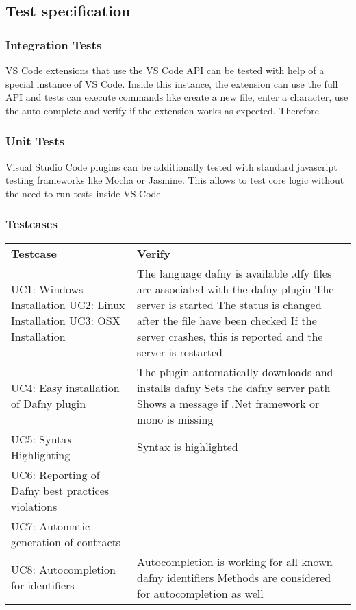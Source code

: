 \subsection{Test specification}

\subsubsection{Integration Tests}
VS Code extensions that use the VS Code API can be tested with help of a special instance of VS Code. Inside this instance, the extension can use the full API and tests can execute commands like create a new file, enter a character, use the auto-complete and verify if the extension works as expected. Therefore  


\subsubsection{Unit Tests}
	Visual Studio Code plugins can be additionally tested with standard javascript testing frameworks like Mocha or Jasmine. This allows to test core logic without the need to run tests inside VS Code. 

\subsubsection{Testcases}

\begin{longtable}{ p{} | p{} }
	\textbf{Testcase} & \textbf{Verify}\\
	UC1: Windows Installation\newline 
	UC2: Linux Installation\newline 
	UC3: OSX Installation & 
		The language dafny is available\newline 
		.dfy files are associated with the dafny plugin\newline
		The server is started\newline
		The status is changed after the file have been checked\newline
		If the server crashes, this is reported and the server is restarted
	\\
	UC4: Easy installation of Dafny plugin & 
		The plugin automatically downloads and installs dafny\newline
		Sets the dafny server path \newline
		Shows a message if .Net framework or mono is missing
	\\
	UC5: Syntax Highlighting & 
		Syntax is highlighted
	\\
	UC6: Reporting of Dafny best practices violations &
		\todo{?}
	
 	\\
	UC7: Automatic generation of contracts & \todo{Invariant: Require and ensures are generated?} \\
	UC8: Autocompletion for identifiers & 
		Autocompletion is working for all known dafny identifiers\newline
		Methods are considered for autocompletion as well
		
	
	\\
\end{longtable}
